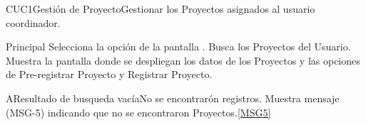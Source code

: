 	\begin{UseCase}{CUC1}{Gestión de Proyecto}{Gestionar los Proyectos asignados al usuario coordinador.}
	\end{UseCase}
	
	
	\begin{UCtrayectoria}{Principal}
		\UCpaso[\UCactor] Selecciona la opción  de la pantalla .
		\UCpaso Busca los Proyectos del Usuario.
		\UCpaso Muestra la pantalla  donde se despliegan los datos de los Proyectos y las opciones de Pre-registrar Proyecto y Registrar Proyecto.
	\end{UCtrayectoria}

	\begin{UCtrayectoriaA}{A}{Resultado de busqueda vacía}{No se encontrarón registros.}
		\UCpaso Muestra mensaje (MSG-5) indicando que no se encontraron Proyectos.\ref{MSG5}
	\end{UCtrayectoriaA}



